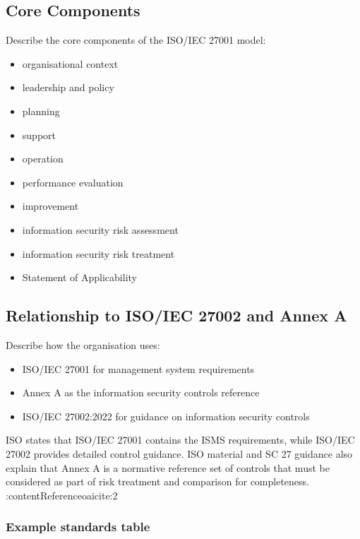\documentclass[
  letterpaper,
  DIV=11,
  numbers=noendperiod]{scrartcl}
\providecommand{\tightlist}{%
  \setlength{\itemsep}{0pt}\setlength{\parskip}{0pt}}
\begin{document}
\subsection{Core Components}\label{core-components}

Describe the core components of the ISO/IEC 27001 model:

\begin{itemize}
\tightlist
\item
  organisational context
\item
  leadership and policy
\item
  planning
\item
  support
\item
  operation
\item
  performance evaluation
\item
  improvement
\item
  information security risk assessment
\item
  information security risk treatment
\item
  Statement of Applicability
\end{itemize}

\subsection{Relationship to ISO/IEC 27002 and Annex
A}\label{relationship-to-isoiec-27002-and-annex-a}

Describe how the organisation uses:

\begin{itemize}
\tightlist
\item
  ISO/IEC 27001 for management system requirements
\item
  Annex A as the information security controls reference
\item
  ISO/IEC 27002:2022 for guidance on information security controls
\end{itemize}

ISO states that ISO/IEC 27001 contains the ISMS requirements, while
ISO/IEC 27002 provides detailed control guidance. ISO material and SC 27
guidance also explain that Annex A is a normative reference set of
controls that must be considered as part of risk treatment and
comparison for completeness. :contentReference{oaicite:2}

\subsubsection{Example standards table}\label{example-standards-table}
\end{document}
